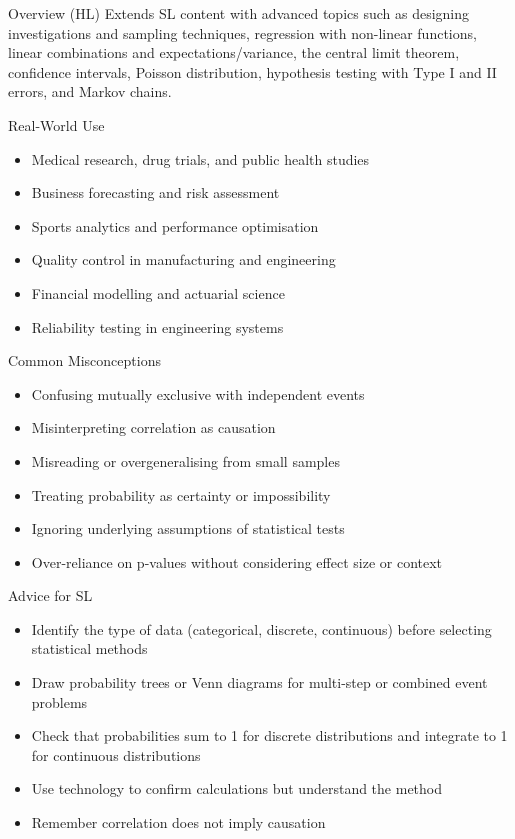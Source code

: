 \documentclass[11pt]{article}
\def\textbf#1{#1}%
\begin{document}
\textbf{Overview (HL)}  
Extends SL content with advanced topics such as designing investigations and sampling techniques, regression with non-linear functions, linear combinations and expectations/variance, the central limit theorem, confidence intervals, Poisson distribution, hypothesis testing with Type I and II errors, and Markov chains.

\textbf{Real-World Use}  
\begin{itemize}
  \item Medical research, drug trials, and public health studies
  \item Business forecasting and risk assessment
  \item Sports analytics and performance optimisation
  \item Quality control in manufacturing and engineering
  \item Financial modelling and actuarial science
  \item Reliability testing in engineering systems
\end{itemize}

\textbf{Common Misconceptions}  
\begin{itemize}
  \item Confusing mutually exclusive with independent events
  \item Misinterpreting correlation as causation
  \item Misreading or overgeneralising from small samples
  \item Treating probability as certainty or impossibility
  \item Ignoring underlying assumptions of statistical tests
  \item Over-reliance on p-values without considering effect size or context
\end{itemize}

\textbf{Advice for SL}  
\begin{itemize}
  \item Identify the type of data (categorical, discrete, continuous) before selecting statistical methods
  \item Draw probability trees or Venn diagrams for multi-step or combined event problems
  \item Check that probabilities sum to 1 for discrete distributions and integrate to 1 for continuous distributions
  \item Use technology to confirm calculations but understand the method
  \item Remember correlation does not imply causation
\end{itemize}
\end{document}
